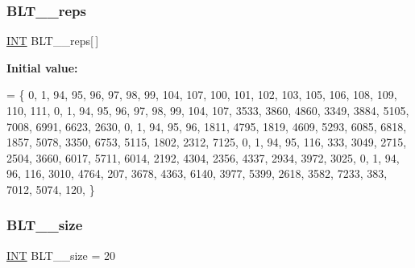 \mbox{\label{data___b_l_t_8_c_a412e96e548400933bd0f8b923566958e}} 
\subsubsection{\texorpdfstring{B\+L\+T\+\_\+\_\+reps}{BLT\_19\_reps}}
{\footnotesize\ttfamily \mbox{\hyperlink{galois_8h_a09fddde158a3a20bd2dcadb609de11dc}{I\+NT}} B\+L\+T\+\_\+\_\+reps\mbox{[}$\,$\mbox{]}}

{\bfseries Initial value\+:}
\begin{DoxyCode}
= \{
    0, 1, 94, 95, 96, 97, 98, 99, 104, 107, 100, 101, 102, 103, 105, 106, 108, 109, 110, 111, 
    0, 1, 94, 95, 96, 97, 98, 99, 104, 107, 3533, 3860, 4860, 3349, 3884, 5105, 7008, 6991, 6623, 2630, 
    0, 1, 94, 95, 96, 1811, 4795, 1819, 4609, 5293, 6085, 6818, 1857, 5078, 3350, 6753, 5115, 1802, 2312, 
      7125, 
    0, 1, 94, 95, 116, 333, 3049, 2715, 2504, 3660, 6017, 5711, 6014, 2192, 4304, 2356, 4337, 2934, 3972, 
      3025, 
    0, 1, 94, 96, 116, 3010, 4764, 207, 3678, 4363, 6140, 3977, 5399, 2618, 3582, 7233, 383, 7012, 5074, 
      120, 
\}
\end{DoxyCode}
\mbox{\label{data___b_l_t_8_c_a3285d2af3d577d9c867b5b1dfb152f63}} 
\subsubsection{\texorpdfstring{B\+L\+T\+\_\+\_\+size}{BLT\_19\_size}}
{\footnotesize\ttfamily \mbox{\hyperlink{galois_8h_a09fddde158a3a20bd2dcadb609de11dc}{I\+NT}} B\+L\+T\+\_\+\_\+size = 20}

\mbox{\label{data___b_l_t_8_c_a82cd9af2338f72a6ed54a6a1770803e9}} 
